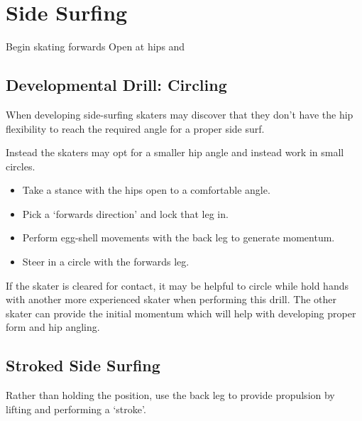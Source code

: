 \section{Side Surfing}
\label{sec:sticky/side_surf}

Begin skating forwards
Open at hips and    



\subsection*{Developmental Drill: Circling}

When developing side-surfing skaters may discover that they don't have the hip flexibility to reach the required angle for a proper side surf.   

Instead the skaters may opt for a smaller hip angle and instead work in small circles. 

\begin{itemize}
\item Take a stance with the hips open to a comfortable angle.
\item Pick a `forwards direction' and lock that leg in. 
\item Perform egg-shell movements with the back leg to generate momentum. 
\item Steer in a circle with the forwards leg.
\end{itemize}


If the skater is cleared for contact, it may be helpful to circle while hold hands with another more experienced skater when performing this drill.  
The other skater can provide the initial momentum which will help with developing proper form and hip angling.  

\subsection*{Stroked Side Surfing}

Rather than holding the position, use the back leg to provide propulsion by lifting and performing a `stroke'.    
